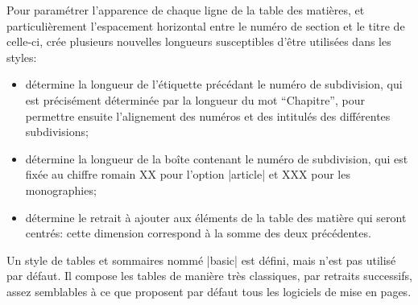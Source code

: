 \begin{developer}
Pour paramétrer l'apparence de chaque ligne de la table des matières, et particulièrement l'espacement horizontal entre le numéro de section et le titre de celle-ci, \frenchlaw crée plusieurs nouvelles longueurs susceptibles d'être utilisées dans les styles:
\begin{itemize}
	\item{} détermine la longueur de l'étiquette précédant le numéro de subdivision, qui est précisément déterminée par la longueur du mot \enquote{Chapitre}, pour permettre ensuite l'alignement des numéros et des intitulés des différentes subdivisions;
	\item{} détermine la longueur de la boîte contenant le numéro de subdivision, qui est fixée au chiffre romain XX pour l'option |article| et XXX pour les monographies;
	\item{} détermine le retrait à ajouter aux éléments de la table des matière qui seront centrés: cette dimension correspond à la somme des deux précédentes.
\end{itemize}
\end{developer}

\begin{noprint}
\newlength{\toclabelwidth}
	\settowidth{\toclabelwidth}{\cftchapterfont\chaptername\space}

\newlength{\tocnumwidth}
\if@article
	\settowidth{\tocnumwidth}{\cftsectionfont XX\space}
\else
	\settowidth{\tocnumwidth}{\cftchapterfont XXX\space}
\fi

\newlength{\toccenterwidth}
	\setlength{\toccenterwidth}{\tocnumwidth}
	\addtolength{\toccenterwidth}{\toclabelwidth}
\end{noprint}

Un style de tables et sommaires nommé |basic| est défini, mais n'est pas utilisé par défaut. Il compose les tables de manière très classiques, par retraits successifs, assez semblables à ce que proposent par défaut tous les logiciels de mise en pages.

